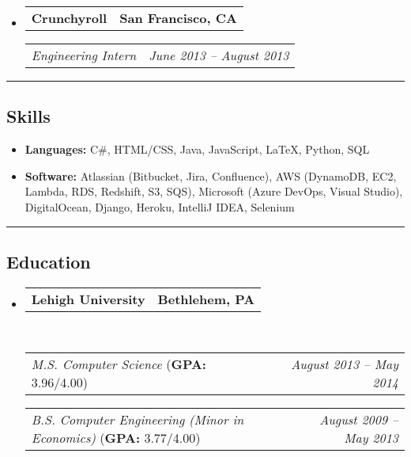 \documentclass[11pt,letterpaper]{article}
\makeatletter
\newcommand{\headerrow}[2]
{\begin{tabular*}{\linewidth}{l@{\extracolsep{\fill}}r}
	#1 &
	#2 \\
\end{tabular*}}
\makeatother
\begin{document}
\begin{itemize}[leftmargin=1em]
	\item
	\headerrow
		{\textbf{Crunchyroll}}
		{\textbf{San Francisco, CA}}
	\headerrow
		{\emph{Engineering Intern}}
		{\emph{June 2013 -- August 2013}}
\end{itemize}

\hrule
\vspace{-1em}

\subsection*{\Large Skills}

\begin{itemize}[leftmargin=1em,noitemsep]
	\item \textbf{Languages:}
	C\#, HTML/CSS, Java, JavaScript, \LaTeX, Python, SQL
	\item \textbf{Software:}
	Atlassian (Bitbucket, Jira, Confluence), AWS (DynamoDB, EC2, Lambda, RDS, Redshift, S3, SQS), Microsoft (Azure DevOps, Visual Studio), DigitalOcean, Django, Heroku, IntelliJ IDEA, Selenium
\end{itemize}

\hrule
\vspace{-1em}

\subsection*{\Large Education}

\begin{itemize}[leftmargin=1em]
	\parskip=0.1em

	\item 
	\headerrow
		{\textbf{Lehigh University}}
		{\textbf{Bethlehem, PA}}
	\\
	\headerrow
		{\emph{M.S. Computer Science} (\textbf{GPA:} 3.96/4.00)} 
		{\emph{August 2013 -- May 2014}}
	\headerrow
		{\emph{B.S. Computer Engineering (Minor in Economics)} (\textbf{GPA:} 3.77/4.00)}
		{\emph{August 2009 -- May 2013}}
\end{itemize}
\end{document}
